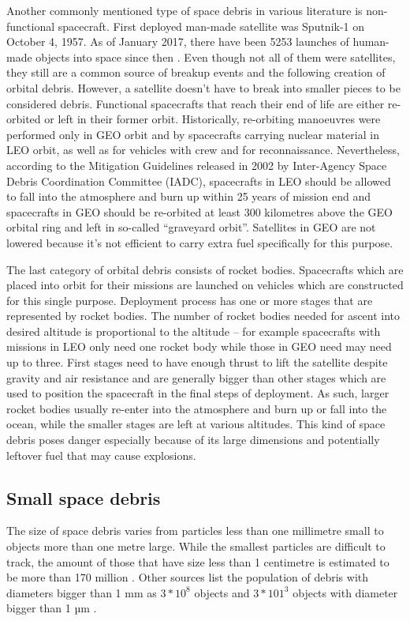 	Another commonly mentioned type of space debris in various literature is non-functional spacecraft. First deployed man-made satellite was Sputnik-1 on October 4, 1957. As of January 2017, there have been 5253 launches of human-made objects into space since then \citep{esabr336}. Even though not all of them were satellites, they still are a common source of breakup events and the following creation of orbital debris. However, a satellite doesn’t have to break into smaller pieces to be considered debris. Functional spacecrafts that reach their end of life are either re-orbited or left in their former orbit. Historically, re-orbiting manoeuvres were performed only in GEO orbit and by spacecrafts carrying nuclear material in LEO orbit, as well as for vehicles with crew and for reconnaissance. Nevertheless, according to the Mitigation Guidelines released in 2002 by Inter-Agency Space Debris Coordination Committee (IADC), spacecrafts in LEO should be allowed to fall into the atmosphere and burn up within 25 years of mission end and spacecrafts in GEO should be re-orbited at least 300 kilometres above the GEO orbital ring and left in so-called “graveyard orbit”. Satellites in GEO are not lowered because it’s not efficient to carry extra fuel specifically for this purpose.
	
	The last category of orbital debris consists of rocket bodies. Spacecrafts which are placed into orbit for their missions are launched on vehicles which are constructed for this single purpose. Deployment process has one or more stages that are represented by rocket bodies. The number of rocket bodies needed for ascent into desired altitude is proportional to the altitude – for example spacecrafts with missions in LEO only need one rocket body while those in GEO need may need up to three. First stages need to have enough thrust to lift the satellite despite gravity and air resistance and are generally bigger than other stages which are used to position the spacecraft in the final steps of deployment. As such, larger rocket bodies usually re-enter into the atmosphere and burn up or fall into the ocean, while the smaller stages are left at various altitudes. This kind of space debris poses danger especially because of its large dimensions and potentially leftover fuel that may cause explosions.
	
\subsection{Small space debris}\label{subsec:small_space_debris}
The size of space debris varies from particles less than one millimetre small to objects more than one metre large. While the smallest particles are difficult to track, the amount of those that have size less than 1 centimetre is estimated to be more than 170 million \citep{esabr336}. Other sources list the population of debris with diameters bigger than 1 mm as $3*10^8$ objects and $3*101^3$ objects with diameter bigger than 1 µm \citep{klinkrad2006space}. 


